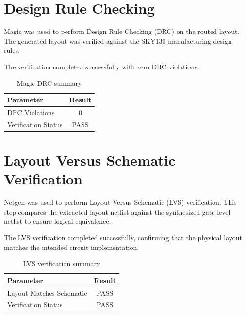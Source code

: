 
\section{Design Rule Checking}

Magic was used to perform Design Rule Checking (DRC) on the routed layout. The generated layout was verified against the SKY130 manufacturing design rules.

The verification completed successfully with zero DRC violations.

\begin{table}[!htbp]
\centering
\caption{Magic DRC summary}
\label{tab:drc_summary}
\begin{tabular}{lc}
\toprule
Parameter & Result\\
\midrule
DRC Violations & 0\\
Verification Status & PASS\\
\bottomrule
\end{tabular}
\end{table}


\section{Layout Versus Schematic Verification}

Netgen was used to perform Layout Versus Schematic (LVS) verification. This step compares the extracted layout netlist against the synthesized gate-level netlist to ensure logical equivalence.


The LVS verification completed successfully, confirming that the physical layout matches the intended circuit implementation.

\begin{table}[!htbp]
\centering
\caption{LVS verification summary}
\label{tab:lvs_summary}
\begin{tabular}{lc}
\toprule
Parameter & Result\\
\midrule
Layout Matches Schematic & PASS\\
Verification Status & PASS\\
\bottomrule
\end{tabular}
\end{table}


